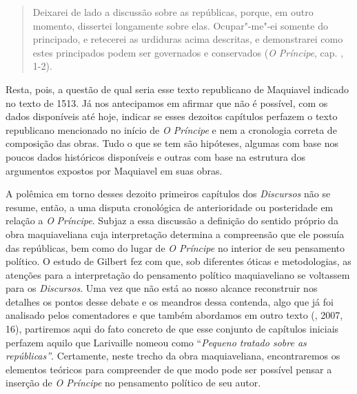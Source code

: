 \begin{quote}
Deixarei de lado a discussão sobre as repúblicas, porque, em outro
momento, dissertei longamente sobre elas. Ocupar"-me"-ei somente do
principado, e retecerei as urdiduras acima descritas, e demonstrarei
como estes principados podem ser governados e conservados (\emph{O
Príncipe}, cap. , 1-2).
\end{quote}

Resta, pois, a questão de qual seria esse texto republicano de Maquiavel
indicado no texto de 1513. Já nos antecipamos em afirmar que não é
possível, com os dados disponíveis até hoje, indicar se esses dezoitos
capítulos perfazem o texto republicano mencionado no início de \emph{O
Príncipe} e nem a cronologia correta de composição das obras. Tudo o que
se tem são hipóteses, algumas com base nos poucos dados históricos
disponíveis e outras com base na estrutura dos argumentos expostos por
Maquiavel em suas obras.

A polêmica em torno desses dezoito primeiros capítulos dos
\emph{Discursos} não se resume, então, a uma disputa cronológica de
anterioridade ou posteridade em relação a \emph{O} \emph{Príncipe}.
Subjaz a essa discussão a definição do sentido próprio da obra
maquiaveliana cuja interpretação determina a compreensão que ele possuía
das repúblicas, bem como do lugar de \emph{O Príncipe} no interior de
seu pensamento político. O estudo de Gilbert fez com que, sob diferentes
óticas e metodologias, as atenções para a interpretação do pensamento
político maquiaveliano se voltassem para os \emph{Discursos}. Uma vez
que não está ao nosso alcance reconstruir nos detalhes os pontos desse
debate e os meandros dessa contenda, algo que já foi analisado pelos
comentadores e que também abordamos em outro texto (, 2007, 16),
partiremos aqui do fato concreto de que esse conjunto de capítulos
iniciais perfazem aquilo que Larivaille nomeou como ``\emph{Pequeno
tratado sobre as repúblicas''}. Certamente, neste trecho da obra
maquiaveliana, encontraremos os elementos teóricos para compreender de
que modo pode ser possível pensar a inserção de \emph{O Príncipe} no
pensamento político de seu autor.


